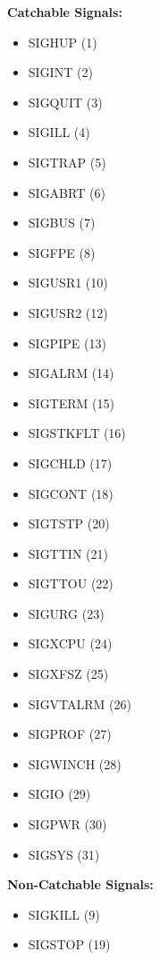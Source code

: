 \textbf{Catchable Signals:} \newline
\begin{itemize}
    \item SIGHUP (1)
    \item SIGINT (2)
    \item SIGQUIT (3)
    \item SIGILL (4)
    \item SIGTRAP (5)
    \item SIGABRT (6)
    \item SIGBUS (7)
    \item SIGFPE (8)
    \item SIGUSR1 (10)
    \item SIGUSR2 (12)
    \item SIGPIPE (13)
    \item SIGALRM (14)
    \item SIGTERM (15)
    \item SIGSTKFLT (16)
    \item SIGCHLD (17)
    \item SIGCONT (18)
    \item SIGTSTP (20)
    \item SIGTTIN (21)
    \item SIGTTOU (22)
    \item SIGURG (23)
    \item SIGXCPU (24)
    \item SIGXFSZ (25)
    \item SIGVTALRM (26)
    \item SIGPROF (27)
    \item SIGWINCH (28)
    \item SIGIO (29)
    \item SIGPWR (30)
    \item SIGSYS (31) \newline
\end{itemize}

\textbf{Non-Catchable Signals:} \newline \newline

\begin{itemize}
    \item SIGKILL (9)
    \item SIGSTOP (19)
\end{itemize}